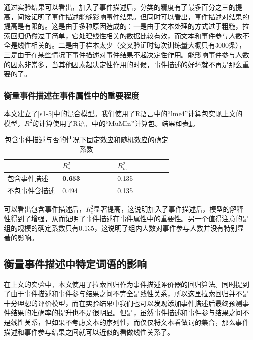 通过实验结果可以看出，加入了事件描述后，分类的精度有了最多百分之三的提高，间接证明了事件描述能够影响事件结果。但同时可以看出，事件描述对结果的提高是有限的。这是由于多种原因造成的：一是由于文本处理的方式过于粗糙，拉索回归仍然过于简单，它处理线性相关的数据比较有效，而文本和事件参与人数不全是线性相关的。二是由于样本太少（交叉验证时每次训练量大概只有3000条），三是由于在某些情况下事件描述对事件结果不起决定性作用。能影响事件参与人数的因素非常多，当其他因素起决定性作用的时候，事件描述的好坏就不再是那么重要的了。

\subsubsection{衡量事件描述在事件属性中的重要程度}
本文建立了\ref{s1-5}中的混合模型。我们使用了R语言中的``lme4''计算包实现上文的模型，\(R^2\)的计算使用了R语言中的``MuMIn''计算包。结果如表\ref{t1-4}。

\begin{table}[htbp]
  \caption{\label{t1-4}包含事件描述与否的情况下固定效应和随机效应的确定系数}
	\centering  
    \begin{tabular*}{\linewidth}{p{0.33\linewidth}p{0.33\linewidth}p{0.33\linewidth}}
  \toprule
    &  \(R_c^2\) & \(R_m^2\) \\ 
  \midrule
		包含事件描述                       & \textbf{0.653} & 0.135 \\ 
    不包事件含描述                        & 0.494 & 0.135 \\ 
  \bottomrule
    \end{tabular*}
\end{table}

可以看出包含事件描述后，\(R_c^2\)显著提高，这说明加入了事件描述后，模型的解释性得到了增强，从而证明了事件描述在事件属性中的重要性。另一个值得注意的是组的规模的确定系数只有0.135，这说明了组内人数对事件参与人数并没有特别显著的影响。

\subsection{衡量事件描述中特定词语的影响}
在上文的实验中，本文使用了拉索回归作为事件描述评价器的回归算法。同时提到了由于事件描述和事件参与结果之间不完全是线性关系，所以这里拉索回归并不是十分理想的评价模型，而在实验结果中我们也可以发现添加事件描述后最终预测事件结果的准确率的提升也不是很明显。但是，虽然事件描述和事件参与结果之间不是线性关系，但如果不考虑文本的序列性，而仅仅将文本看做词的集合，那么事件描述和事件参与结果之间就可以近似的看做线性关系了。

